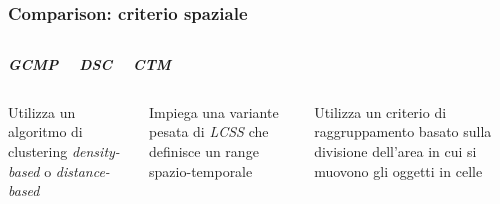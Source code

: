 \documentclass{beamer}
\begin{document}
\begin{frame}
		\frametitle{Comparison: criterio spaziale}
		\begin{columns}
			
			\begin{center}
				\textbf{\textit{\huge{GCMP}}}
				
			\end{center}
		
		\begin{center}
			\textbf{\textit{\huge{DSC}}}
			
		\end{center}
	
	\begin{center}
		\textbf{\textit{\huge{CTM}}}
		
	\end{center}
		\end{columns}
		\begin{columns}
			
			\column{.3\columnwidth}
			
			Utilizza un algoritmo di clustering 
			\textit{density-based} o \textit{distance-based}
		
			
				\column{.3\textwidth}
		
			Impiega una variante pesata di \textit{LCSS} che definisce un range spazio-temporale
			
				\column{.3\textwidth}
			    
				Utilizza un criterio di raggruppamento basato sulla divisione dell'area
				in cui si muovono gli oggetti in celle
		\end{columns}
	\end{frame}     
\end{document}
